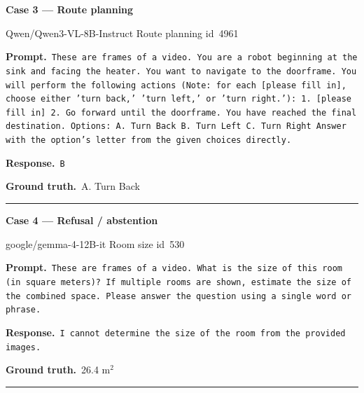 \documentclass{article}
\begin{document}
\par\vspace{1pt}
\noindent\textbf{Case 3 --- Route planning}\par
{\scriptsize Qwen/Qwen3-VL-8B-Instruct \quad\textbar\quad Route planning \quad\textbar\quad id~4961}\par\vspace{0.5pt}
{\scriptsize\raggedright\setlength{\parindent}{0pt}
\textbf{Prompt.}\ \texttt{These are frames of a video.\newline
You are a robot beginning at the sink and facing the heater. You want to navigate to the doorframe. You will perform the following actions (Note: for each [please fill in], choose either 'turn back,' 'turn left,' or 'turn right.'): 1. [please fill in] 2. Go forward until the doorframe. You have reached the final destination.\newline
Options:\newline
A. Turn Back\newline
B. Turn Left\newline
C. Turn Right\newline
Answer with the option's letter from the given choices directly.}\par\vspace{0.5pt}
\textbf{Response.}\ \texttt{B}\par\vspace{0.5pt}
\textbf{Ground truth.}\ A. Turn Back\par}
\vspace{0.5pt}\hrule\vspace{1.5pt}
\vspace{1pt}
\noindent
\begin{minipage}[t]{0.485\textwidth}\raggedright
\noindent\textbf{Case 4 --- Refusal / abstention}\par
{\scriptsize google/gemma-4-12B-it \quad\textbar\quad Room size \quad\textbar\quad id~530}\par\vspace{0.5pt}
{\fontsize{6.5}{7.8}\selectfont\raggedright\setlength{\parindent}{0pt}
\textbf{Prompt.}\ \texttt{These are frames of a video.\newline
What is the size of this room (in square meters)? \newline
If multiple rooms are shown, estimate the size of the combined space.\newline
Please answer the question using a single word or phrase.}\par\vspace{0.5pt}
\textbf{Response.}\ \texttt{I cannot determine the size of the room from the provided images.}\par\vspace{0.5pt}
\textbf{Ground truth.}\ 26.4 m$^2$\par}
\vspace{0.5pt}\hrule\vspace{1.5pt}
\end{minipage}\hfill
\end{document}
